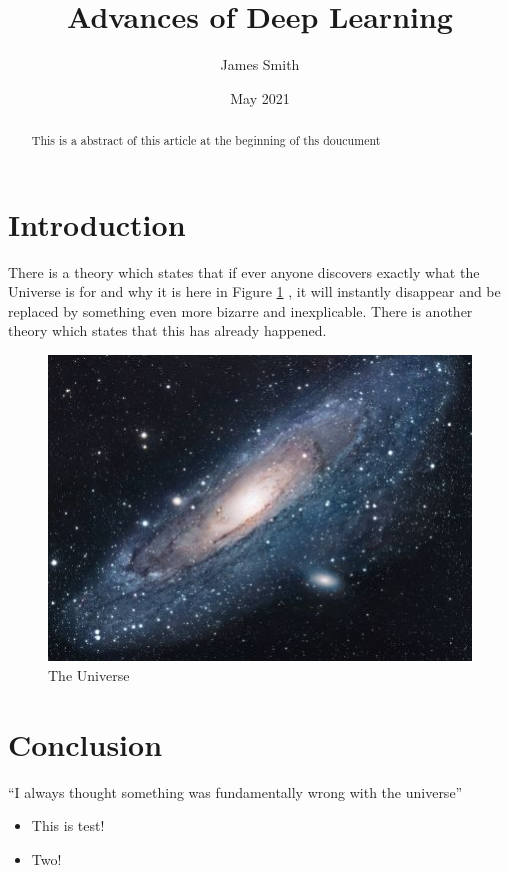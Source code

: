\documentclass{article}
\begin{document}
	
	\title{Advances of Deep Learning}
	\author{James Smith}
	\date{May 2021}
	\maketitle
	
	\begin{abstract}
		This is a abstract of this article at the beginning of ths doucument
	\end{abstract}
	
	\section{Introduction}
	There is a theory which states that if ever anyone discovers exactly what the Universe is for and why it is here in Figure \ref{fig:universe} , it will instantly disappear and be replaced by something even more bizarre and inexplicable.\citep{adams1995hitchhiker}
	There is another theory which states that this has already happened.
	
	\begin{figure}[h!]
		\centering
		\includegraphics[scale=3]{img/universe}
		\caption{The Universe}
		\label{fig:universe}
	\end{figure}
	
	\section{Conclusion}
	``I always thought something was fundamentally wrong with the universe'' \citep{adams1995hitchhiker}
	
	
	\begin{itemize}
		\item This is test!
		\item Two!
	\end{itemize}
	
	
	
\end{document}
